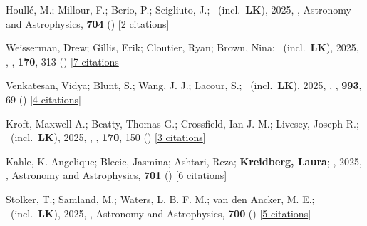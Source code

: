 \item[{\color{numcolor}\scriptsize147}] Houll{\'e}, M.; Millour, F.; Berio, P.; Scigliuto, J.; \etal\ (incl.\ \textbf{LK}), 2025, , Astronomy and Astrophysics, \textbf{704} () [\href{https://ui.adsabs.harvard.edu/abs/2025A&A...704A.182H}{2 citations}]

\item[{\color{numcolor}\scriptsize146}] Weisserman, Drew; Gillis, Erik; Cloutier, Ryan; Brown, Nina; \etal\ (incl.\ \textbf{LK}), 2025, , \aj, \textbf{170}, 313 () [\href{https://ui.adsabs.harvard.edu/abs/2025AJ....170..313W}{7 citations}]

\item[{\color{numcolor}\scriptsize145}] Venkatesan, Vidya; Blunt, S.; Wang, J. J.; Lacour, S.; \etal\ (incl.\ \textbf{LK}), 2025, , \apj, \textbf{993}, 69 () [\href{https://ui.adsabs.harvard.edu/abs/2025ApJ...993...69V}{4 citations}]

\item[{\color{numcolor}\scriptsize144}] Kroft, Maxwell A.; Beatty, Thomas G.; Crossfield, Ian J. M.; Livesey, Joseph R.; \etal\ (incl.\ \textbf{LK}), 2025, , \aj, \textbf{170}, 150 () [\href{https://ui.adsabs.harvard.edu/abs/2025AJ....170..150K}{3 citations}]

\item[{\color{numcolor}\scriptsize143}] Kahle, K. Angelique; Blecic, Jasmina; Ashtari, Reza; \textbf{Kreidberg, Laura}; \etal, 2025, , Astronomy and Astrophysics, \textbf{701} () [\href{https://ui.adsabs.harvard.edu/abs/2025A&A...701A.184K}{6 citations}]

\item[{\color{numcolor}\scriptsize142}] Stolker, T.; Samland, M.; Waters, L. B. F. M.; van den Ancker, M. E.; \etal\ (incl.\ \textbf{LK}), 2025, , Astronomy and Astrophysics, \textbf{700} () [\href{https://ui.adsabs.harvard.edu/abs/2025A&A...700A..21S}{5 citations}]

